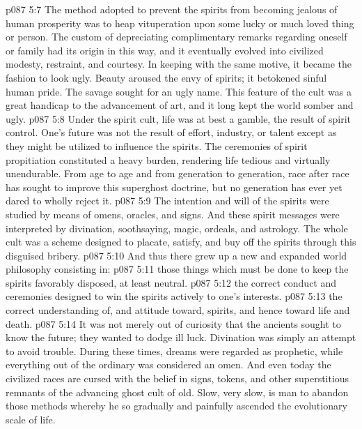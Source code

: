 \vs p087 5:7 The method adopted to prevent the spirits from becoming jealous of human prosperity was to heap vituperation upon some lucky or much loved thing or person. The custom of depreciating complimentary remarks regarding oneself or family had its origin in this way, and it eventually evolved into civilized modesty, restraint, and courtesy. In keeping with the same motive, it became the fashion to look ugly. Beauty aroused the envy of spirits; it betokened sinful human pride. The savage sought for an ugly name. This feature of the cult was a great handicap to the advancement of art, and it long kept the world somber and ugly.
\pc \vs p087 5:8 Under the spirit cult, life was at best a gamble, the result of spirit control. One’s future was not the result of effort, industry, or talent except as they might be utilized to influence the spirits. The ceremonies of spirit propitiation constituted a heavy burden, rendering life tedious and virtually unendurable. From age to age and from generation to generation, race after race has sought to improve this superghost doctrine, but no generation has ever yet dared to wholly reject it.
\vs p087 5:9 The intention and will of the spirits were studied by means of omens, oracles, and signs. And these spirit messages were interpreted by divination, soothsaying, magic, ordeals, and astrology. The whole cult was a scheme designed to placate, satisfy, and buy off the spirits through this disguised bribery.
\vs p087 5:10 And thus there grew up a new and expanded world philosophy consisting in:
\pc \vs p087 5:11 \bibnobreakspace {}those things which must be done to keep the spirits favorably disposed, at least neutral.
\vs p087 5:12 \bibnobreakspace {}the correct conduct and ceremonies designed to win the spirits actively to one’s interests.
\vs p087 5:13 \bibnobreakspace {}the correct understanding of, and attitude toward, spirits, and hence toward life and death.
\pc \vs p087 5:14 It was not merely out of curiosity that the ancients sought to know the future; they wanted to dodge ill luck. Divination was simply an attempt to avoid trouble. During these times, dreams were regarded as prophetic, while everything out of the ordinary was considered an omen. And even today the civilized races are cursed with the belief in signs, tokens, and other superstitious remnants of the advancing ghost cult of old. Slow, very slow, is man to abandon those methods whereby he so gradually and painfully ascended the evolutionary scale of life.
